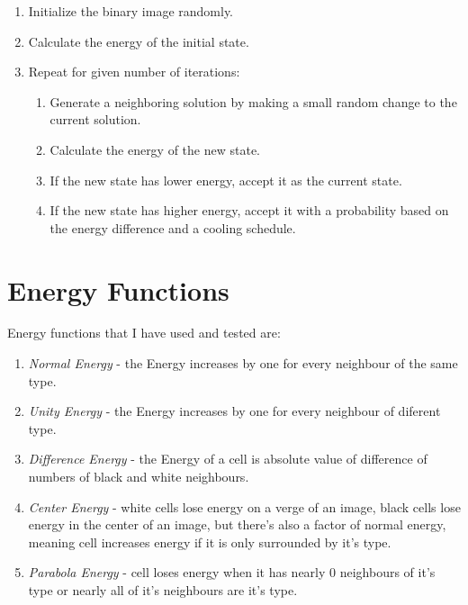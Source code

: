 \documentclass{article}
\begin{document}
\begin{enumerate}
    \item Initialize the binary image randomly.
    \item Calculate the energy of the initial state.
    \item Repeat for given number of iterations:
    \begin{enumerate}
        \item Generate a neighboring solution by making a small random change to the current solution.
        \item Calculate the energy of the new state.
        \item If the new state has lower energy, accept it as the current state.
        \item If the new state has higher energy, accept it with a probability based on the energy difference and a cooling schedule.
    \end{enumerate}
\end{enumerate}

\section*{Energy Functions}
Energy functions that I have used and tested are:
\begin{enumerate}
    \item \textit{Normal Energy} - the Energy increases by one for every neighbour of the same type.
    \item \textit{Unity Energy} - the Energy increases by one for every neighbour of diferent type. 
    \item \textit{Difference Energy} - the Energy of a cell is absolute value of difference of numbers of  black and white neighbours. 
    \item \textit{Center Energy} - white cells lose energy  on a verge of an image, black cells lose energy in the center of an image, but there's also a factor of normal energy, meaning cell increases energy if it is only surrounded by it's type.
    \item \textit{Parabola Energy} - cell loses energy when it has nearly 0 neighbours of it's type or nearly all of it's neighbours are it's type. 
\end{enumerate}
\end{document}
